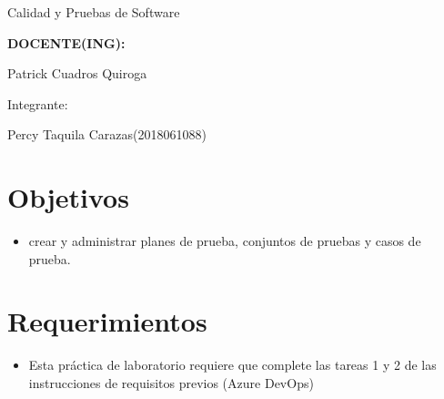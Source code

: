 \documentclass[12pt,letterpaper]{article}
\begin{document}
\begin{titlepage}
\begin{center}
\vspace*{0.1in}
\begin{large}
Calidad y Pruebas de Software\\
\end{large}

\vspace*{0.3in}
\begin{Large}
\textbf{DOCENTE(ING):} \\
\end{Large}

\vspace*{0.1in}
\begin{large}
 Patrick Cuadros Quiroga\\
\end{large}

\vspace*{0.2in}
\vspace*{0.1in}
\begin{large}
Integrante: \\
\begin{flushleft}
Percy Taquila Carazas\hfill	(2018061088) \\
\end{flushleft}
\end{large}
\end{center}

\end{titlepage}

\tableofcontents %
\thispagestyle{empty} %
\newpage
\setcounter{page}{1} %


\section{Objetivos} 
\begin{itemize}
\item crear y administrar planes de prueba, conjuntos de pruebas y casos de prueba.
\end{itemize}



\section{Requerimientos} 

\begin{itemize}
\item Esta práctica de laboratorio requiere que complete las tareas 1 y 2 de las instrucciones de requisitos previos (Azure DevOps)

\end{itemize}
\end{document}
